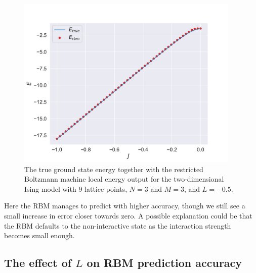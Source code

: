 \begin{figure}[H]
  \begin{center}
    \includegraphics[width=0.95\textwidth]{Figures/Plots/Ising/val-true[J][-1.0-0.0][e=500][n=9][L=-0.5]}
  \end{center} 
  \caption{The true ground state energy together with the restricted Boltzmann machine local energy output for the two-dimensional Ising model with $9$ lattice points, $N=3$ and $M=3$, and $L=-0.5$.}
\end{figure}

Here the RBM manages to predict with higher accuracy, though we still see a small increase in error closer towards zero. A possible explanation could be that the RBM defaults to the non-interactive state as the interaction strength becomes small enough.

\subsection{The effect of \texorpdfstring{$L$}{L} on RBM prediction accuracy}

